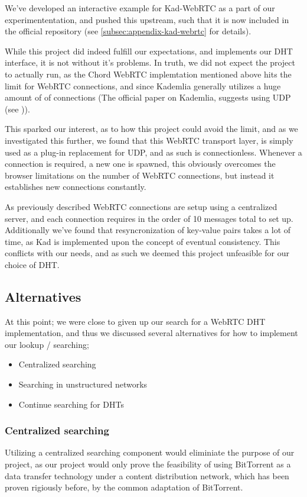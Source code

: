 We've developed an interactive example for Kad-WebRTC as a part of our
experimententation, and pushed this upstream, such that it is now included in 
the official repository (see \ref{subsec:appendix-kad-webrtc} for details).

While this project did indeed fulfill our expectations, and implements our DHT
interface, it is not without it's problems. In truth, we did not expect the 
project to actually run, as the Chord WebRTC implemtation mentioned above hits
the limit for WebRTC connections, and since Kademlia generally utilizes a huge
amount of of connections (The official paper on Kademlia, suggests using UDP
(see \citep{Maymounkov:Kademlia})).

This sparked our interest, as to how this project could avoid the limit, and as
we investigated this further, we found that this WebRTC transport layer, is
simply used as a plug-in replacement for UDP, and as such is connectionless.
Whenever a connection is required, a new one is spawned, this obviously
overcomes the browser limitations on the number of WebRTC connections, but 
instead it establishes new connections constantly.

As previously described WebRTC connections are setup using a centralized server,
and each connection requires in the order of 10 messages total to set up.
Additionally we've found that resyncronization of key-value pairs takes a lot
of time, as Kad is implemented upon the concept of eventual consistency. This
conflicts with our needs, and as such we deemed this project unfeasible for
our choice of DHT.

\subsection{Alternatives}
At this point; we were close to given up our search for a WebRTC DHT
implementation, and thus we discussed several alternatives for how to
implement our lookup / searching;
\begin{itemize}
\item Centralized searching
\item Searching in unstructured networks
\item Continue searching for DHTs
\end{itemize}

\subsubsection{Centralized searching}
Utilizing a centralized searching component would eliminiate the purpose of our
project, as our project would only prove the feasibility of using BitTorrent as
a data transfer technology under a content distribution network, which has been
proven rigiously before, by the common adaptation of BitTorrent.

